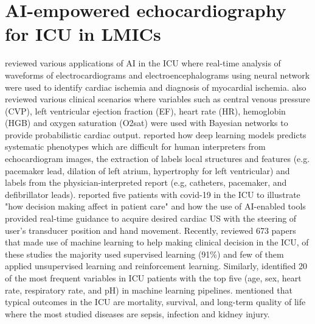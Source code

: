 \documentclass[mlabstract,twocolumn]{jmlr}
\begin{document}
\section{AI-empowered echocardiography for ICU in LMICs}
\citet{hanson2001} reviewed various applications of AI in the ICU where real-time analysis of waveforms of electrocardiograms and electroencephalograms using neural network were used to identify cardiac ischemia and diagnosis of myocardial ischemia.
\citet{hanson2001} also reviewed various clinical scenarios where variables such as central venous pressure (CVP), left ventricular ejection fraction (EF), heart rate (HR), hemoglobin (HGB) and oxygen saturation (O2sat) were used with Bayesian networks to provide probabilistic cardiac output.
\citet{Ghorbani-DigitalMedicineNature-JAN2020} reported how deep learning models predicts systematic phenotypes which are difficult for human interpreters from echocardiogram images, the extraction of labels local structures and features (e.g. pacemaker lead, dilation of left atrium, hypertrophy for left ventricular) and labels from the physician-interpreted report (e.g, catheters, pacemaker, and defibrillator leads).
\citet{CHEEMA2021JACCCaseReports} reported five patients with covid-19 in the ICU to illustrate "how decision making affect in patient care" and how the use of AI-enabled tools provided real-time guidance to acquire desired cardiac US with the steering of user's transducer position and hand movement.
Recently, \citet{hong2022} reviewed 673 papers that made use of machine learning to help making clinical decision in the ICU, of these studies the majority used supervised learning (91\%) and few of them applied unsupervised learning and reinforcement learning.
Similarly, \citet{hong2022} identified 20 of the most frequent variables in ICU patients with the top five (age, sex, heart rate, respiratory rate, and pH) in machine learning pipelines.
\citet{hong2022} mentioned that typical outcomes in the ICU are mortality, survival, and long-term quality of life where the most studied diseases are sepsis, infection and kidney injury.
\end{document}
